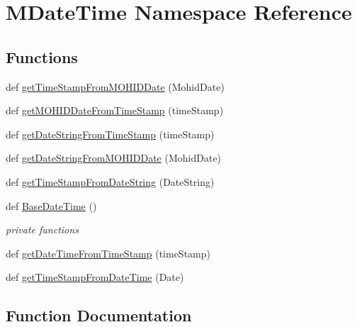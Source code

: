 \hypertarget{namespace_m_date_time}{}\section{M\+Date\+Time Namespace Reference}
\label{namespace_m_date_time}
\subsection*{Functions}
\begin{DoxyCompactItemize}
\item 
def \mbox{\hyperlink{namespace_m_date_time_a038322da9ec8ee2770a307c6a63187dd}{get\+Time\+Stamp\+From\+M\+O\+H\+I\+D\+Date}} (Mohid\+Date)
\item 
def \mbox{\hyperlink{namespace_m_date_time_a0bb2bb194a0935f8ffee0022899d73a5}{get\+M\+O\+H\+I\+D\+Date\+From\+Time\+Stamp}} (time\+Stamp)
\item 
def \mbox{\hyperlink{namespace_m_date_time_ae8319a7fc92ebd8f2702efb32f234ebf}{get\+Date\+String\+From\+Time\+Stamp}} (time\+Stamp)
\item 
def \mbox{\hyperlink{namespace_m_date_time_a57cf43e4864af605636039c5a06672c8}{get\+Date\+String\+From\+M\+O\+H\+I\+D\+Date}} (Mohid\+Date)
\item 
def \mbox{\hyperlink{namespace_m_date_time_a475b426d30876102774a93f17a71d1af}{get\+Time\+Stamp\+From\+Date\+String}} (Date\+String)
\item 
def \mbox{\hyperlink{namespace_m_date_time_a3e8d38d306730c6707a17503e2d21d6c}{Base\+Date\+Time}} ()
\begin{DoxyCompactList}\small\item\em private functions \end{DoxyCompactList}\item 
def \mbox{\hyperlink{namespace_m_date_time_abecc2e4333a1a4191e5b1243cf98131d}{get\+Date\+Time\+From\+Time\+Stamp}} (time\+Stamp)
\item 
def \mbox{\hyperlink{namespace_m_date_time_a577bd538a3fcb0bbddf8900288324eb5}{get\+Time\+Stamp\+From\+Date\+Time}} (Date)
\end{DoxyCompactItemize}


\subsection{Function Documentation}
\mbox{\label{namespace_m_date_time_a3e8d38d306730c6707a17503e2d21d6c}} 
